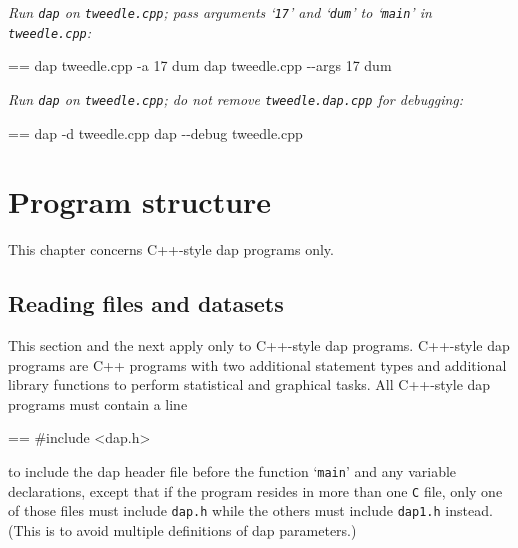 \documentclass{book}
\makeatletter
\newenvironment{Texinfopreformatted}{%
  \par\GNUTobeylines\obeyspaces\frenchspacing\parskip=\z@\parindent=\z@}{}
{\catcode`\^^M=13 \gdef\GNUTobeylines{\catcode`\^^M=13 \def^^M{\null\par}}}
\newenvironment{Texinfoindented}{\begin{list}{}{}\item\relax}{\end{list}}
\renewcommand{\_}{\Texinfounderscore\discretionary{}{}{}}
\makeatother
\begin{document}
\emph{Run \texttt{dap} on \texttt{tweedle.cpp}; pass arguments `\texttt{17}'
and `\texttt{dum}' to `\texttt{main}' in \texttt{tweedle.cpp}:}
\begin{Texinfoindented}
\begin{Texinfopreformatted}%
\ttfamily dap tweedle.cpp -a 17 dum
dap tweedle.cpp {-}{-}args 17 dum
\end{Texinfopreformatted}
\end{Texinfoindented}

\emph{Run \texttt{dap} on \texttt{tweedle.cpp}; do not remove \texttt{tweedle.dap.cpp} for debugging:}
\begin{Texinfoindented}
\begin{Texinfopreformatted}%
\ttfamily dap -d tweedle.cpp
dap {-}{-}debug tweedle.cpp
\end{Texinfopreformatted}
\end{Texinfoindented}

\chapter{{Program structure}}
\label{anchor:Program-structure}%

This chapter concerns C++-style dap programs only.


\section{{Reading files and datasets}}
\label{anchor:Reading-files-and-datasets}%

%
%
This section and the next apply only to C++-style dap programs.
C++-style dap programs are C++ programs with two additional statement types
and additional library functions to perform statistical and graphical tasks.
All C++-style dap programs must contain a line

\begin{Texinfoindented}
\begin{Texinfopreformatted}%
\ttfamily \#include <dap.h>
\end{Texinfopreformatted}
\end{Texinfoindented}
\noindent{}to include the dap header file
%
%
before the function `\texttt{main}' and any variable declarations, except that
if the program resides in more than one \texttt{C} file, only one of those
files must include \texttt{dap.h} while the others must include \texttt{dap1.h} instead.
%
(This is to avoid multiple definitions
%
of dap parameters.)
\end{document}
